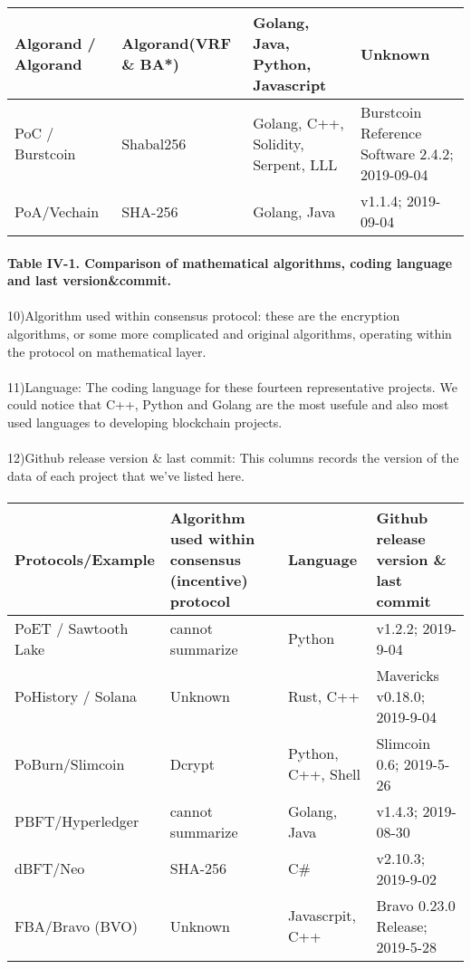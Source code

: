 \documentclass[doublespacing]{bmcart}
\begin{document}
\begin{CJK*}{UTF8}{gbsn}
\begin{tabular}{p{2cm}p{3cm}p{3cm}p{3cm}}
Algorand / Algorand & Algorand(VRF \& BA*) & Golang, Java, Python, Javascript & Unknown \\ \hline
PoC / Burstcoin & Shabal256 & Golang, C++, Solidity, Serpent, LLL & Burstcoin Reference Software 2.4.2; 2019-09-04 \\ \hline
PoA/Vechain & SHA-256 & Golang, Java & v1.1.4; 2019-09-04 \\ \hline
\end{tabular}
\paragraph{Table IV-1. Comparison of mathematical algorithms, coding language and last version\&commit.}
\paragraph{}
10)Algorithm used within consensus protocol: these are the encryption algorithms, or some more complicated and original algorithms, operating within the protocol on mathematical layer. 
\paragraph{}
11)Language: The coding language for these fourteen representative projects. We could notice that C++, Python and Golang are the most usefule and also most used languages to developing blockchain projects.
\paragraph{}
12)Github release version \& last commit: This columns records the version of the data of each project that we've listed here. 
\paragraph{}
\begin{tabular}{p{2cm}p{3cm}p{3cm}p{3cm}}
\hline
Protocols/E\-xample 
& Algorithm used within consensus (incentive) protocol 
& Language 
& Github release version \& last commit \\ \hline

PoET / Sawtooth Lake & cannot summarize & Python & v1.2.2; 2019-9-04\\ \hline
PoHistory / Solana & Unknown & Rust, C++ & Mavericks v0.18.0; 2019-9-04 \\ \hline
PoBurn/\newline Slimcoin &  Dcrypt & Python, C++, Shell & Slimcoin 0.6; 2019-5-26  \\ \hline
PBFT/Hyp\-erledger & cannot summarize & Golang, Java & v1.4.3; 2019-08-30  \\ \hline
dBFT/Neo & SHA-256 & C\# &  v2.10.3; 2019-9-02  \\ \hline
FBA/Bravo (BVO) & Unknown & Javascrpit, C++ & Bravo 0.23.0 Release; 2019-5-28 \\ \hline


\end{tabular}
\end{CJK*}
\end{document}
